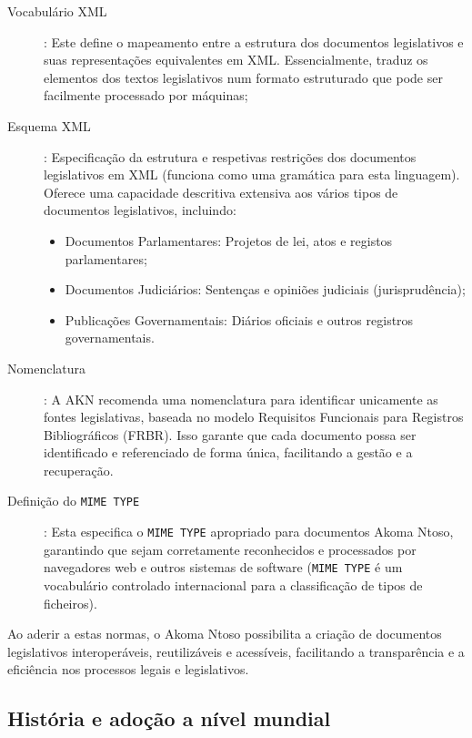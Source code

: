\begin{description}
\item[Vocabulário XML]: Este define o mapeamento entre a estrutura dos documentos legislativos e suas representações equivalentes 
em XML. Essencialmente, traduz os elementos dos textos legislativos num formato estruturado que pode ser facilmente processado por 
máquinas;

\item[Esquema XML]: Especificação da estrutura e respetivas restrições dos documentos legislativos em XML (funciona como uma gramática 
para esta linguagem). 
Oferece uma capacidade descritiva extensiva aos vários tipos de documentos legislativos, incluindo:
    \begin{itemize}
        \item Documentos Parlamentares: Projetos de lei, atos e registos parlamentares;
        \item Documentos Judiciários: Sentenças e opiniões judiciais (jurisprudência);
        \item Publicações Governamentais: Diários oficiais e outros registros governamentais.
    \end{itemize}

\item[Nomenclatura]: A AKN recomenda uma nomenclatura para identificar unicamente as fontes legislativas, 
baseada no modelo Requisitos Funcionais para Registros Bibliográficos (FRBR). 
Isso garante que cada documento possa ser identificado e referenciado de forma única, facilitando a gestão e a recuperação.

\item[Definição do \texttt{MIME TYPE}]: Esta especifica o \texttt{MIME TYPE} apropriado para documentos Akoma Ntoso, 
garantindo que sejam corretamente reconhecidos e processados por navegadores web e outros sistemas de software (\texttt{MIME TYPE} 
é um vocabulário controlado internacional para a classificação de tipos de ficheiros).

\end{description}

Ao aderir a estas normas, o Akoma Ntoso possibilita a criação de documentos legislativos interoperáveis, reutilizáveis 
e acessíveis, facilitando a transparência e a eficiência nos processos legais e legislativos.


\subsection{História e adoção a nível mundial}

